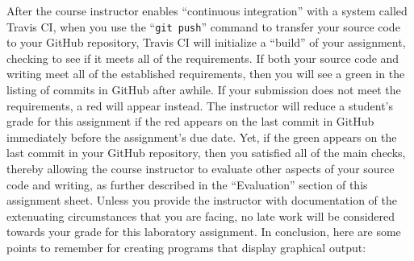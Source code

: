 \documentclass[11pt]{article}
\newcommand{\mainprogramsource}{\lstinline{src/main/java/labfour/DisplayGraphicalScene.java}}
\newcommand{\gatorgraderstart}{\command{gradle grade}}
\newcommand{\gatorgradercheck}{\command{gradle grade}}
\newcommand{\gitcommit}{\command{git commit}}
\newcommand{\gitpush}{\command{git push}}
\newcommand{\gitcommitmainprogram}{\command{git commit src/main/java/labfour/DisplayGraphicalScene.java -m "Your
descriptive commit message"}}
\newcommand{\command}[1]{``\lstinline{#1}''}
\newcommand{\step}[1]{``{#1}''}
\newcommand{\checkmark}{\ding{51}}
\newcommand{\naughtmark}{\ding{55}}
\begin{document}

After the course instructor enables \step{continuous integration} with a system
called Travis CI, when you use the \gitpush{} command to transfer your source
code to your GitHub repository, Travis CI will initialize a \step{build} of your
assignment, checking to see if it meets all of the requirements. If both your
source code and writing meet all of the established requirements, then you will
see a green \checkmark{} in the listing of commits in GitHub after awhile. If
your submission does not meet the requirements, a red \naughtmark{} will appear
instead. The instructor will reduce a student's grade for this assignment if the
red \naughtmark{} appears on the last commit in GitHub immediately before the
assignment's due date. Yet, if the green \checkmark{} appears on the last commit
in your GitHub repository, then you satisfied all of the main checks, thereby
allowing the course instructor to evaluate other aspects of your source code and
writing, as further described in the \step{Evaluation} section of this
assignment sheet. Unless you provide the instructor with documentation of the
extenuating circumstances that you are facing, no late work will be considered
towards your grade for this laboratory assignment. In conclusion, here are some
points to remember for creating programs that display graphical output:
\end{document}
